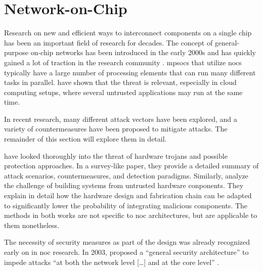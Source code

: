 \section{Network-on-Chip}\label{sec:networkonchiprel}
Research on new and efficient ways to interconnect components on a single chip has been an important field of research for decades. The concept of
general-purpose on-chip networks has been introduced in the early 2000s
\cites{dally01routepacketsnotwires}{kumar02networkonchip}{benini02nocparadigm} and has quickly gained a lot of traction in the research community
\cite[e.g.][]{ivanov05nocintroduction}. 
\Glspl{mpsoc} that utilize \glspl{noc} typically have a large number of processing elements that can run many different
tasks in parallel. \citeauthor{ancajas14fortnocs} have shown that the threat is relevant, especially in cloud computing setups, where several
untrusted applications may run at the same time. \cite{ancajas14fortnocs} %

In recent research, many different attack vectors have been explored, and a variety of countermeasures have been proposed to mitigate
attacks. The remainder of this section will explore them in detail.

\citeauthor{bhunia14hardwaretrojans} \cite{bhunia14hardwaretrojans} have looked thoroughly into the threat of hardware trojans and possible protection
approaches. In a survey-like paper, they provide a detailed summary of attack scenarios, countermeasures, and detection paradigms. Similarly,
\citeauthor{sethumadhavan15trustworthyhardware} \cite{sethumadhavan15trustworthyhardware} analyze the challenge of building systems from untrusted
hardware conponents. They explain in detail how the hardware design and fabrication chain can be adapted to significantly lower the probability of
integrating malicious components. The methods in both works are not specific to \gls{noc} architectures, but are applicable to them nonetheless.

The necessity of security measures as part of the design was already recognized early on in \gls{noc} research. In 2003,
\citeauthor{gebotys03securityframework} \cite{gebotys03securityframework} proposed a \enquote{general security architecture}
\cite[1]{gebotys03securityframework} to impede attacks \enquote{at both the network level […] and at the core level}
\cite[1]{gebotys03securityframework}.

